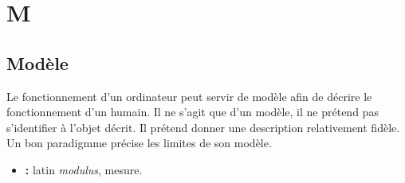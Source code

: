 \chapter{M}
\section{Modèle}
Le fonctionnement d'un ordinateur peut servir de modèle afin de décrire le fonctionnement d'un humain. Il ne s'agit que d'un modèle, il ne prétend pas s'identifier à l'objet décrit. Il prétend donner une description relativement fidèle. Un bon paradigmme précise les limites de son modèle.
{\footnotesize
\begin{itemize}[leftmargin=1cm, label=, itemsep=1pt]
\item {\bf \textsc{} :} latin {\it modulus}, mesure.
\end{itemize}
}

